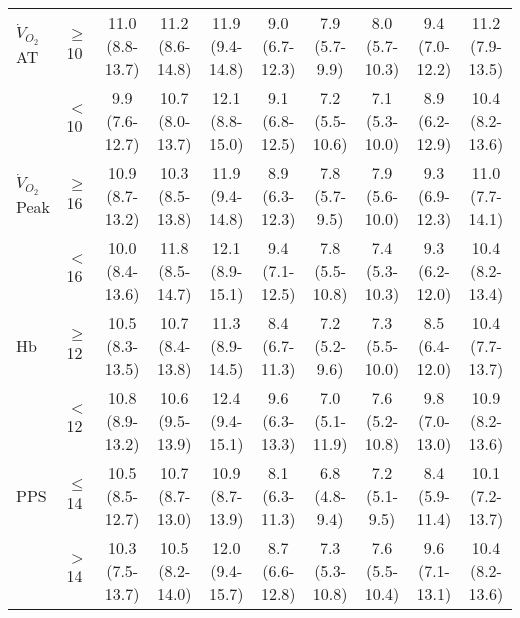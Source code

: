 \begin{sidewaystable}[p]
\begin{tabular}{|l l | cc cc cc cc |}
		$\dot{V}_{O_2}$AT   & $\geq$10  & 11.0 (8.8-13.7) & 11.2 (8.6-14.8) & 11.9 (9.4-14.8)  & 9.0 (6.7-12.3)  & 7.9 (5.7-9.9)  & 8.0 (5.7-10.3) & 9.4 (7.0-12.2)  & 11.2 (7.9-13.5) \\
		                    & $<$10     & 9.9 (7.6-12.7)  & 10.7 (8.0-13.7) & 12.1 (8.8-15.0)  & 9.1 (6.8-12.5)  & 7.2 (5.5-10.6) & 7.1 (5.3-10.0) & 8.9 (6.2-12.9)  & 10.4 (8.2-13.6) \\
		$\dot{V}_{O_2}$Peak & $\geq$16 & 10.9 (8.7-13.2) & 10.3 (8.5-13.8) & 11.9 (9.4-14.8)  & 8.9 (6.3-12.3)  & 7.8 (5.7-9.5)  & 7.9 (5.6-10.0) & 9.3 (6.9-12.3)  & 11.0 (7.7-14.1) \\
		                    & $<$16     & 10.0 (8.4-13.6) & 11.8 (8.5-14.7) & 12.1 (8.9-15.1)  & 9.4 (7.1-12.5)  & 7.8 (5.5-10.8) & 7.4 (5.3-10.3) & 9.3 (6.2-12.0)  & 10.4 (8.2-13.4) \\
		Hb                  & $\geq$12  & 10.5 (8.3-13.5) & 10.7 (8.4-13.8) & 11.3 (8.9-14.5)  & 8.4 (6.7-11.3)  & 7.2 (5.2-9.6)  & 7.3 (5.5-10.0) & 8.5 (6.4-12.0)  & 10.4 (7.7-13.7) \\
		                    & $<$12     & 10.8 (8.9-13.2) & 10.6 (9.5-13.9) & 12.4 (9.4-15.1)  & 9.6 (6.3-13.3)  & 7.0 (5.1-11.9) & 7.6 (5.2-10.8) & 9.8 (7.0-13.0)  & 10.9 (8.2-13.6) \\
		PPS                 & $\leq$14  & 10.5 (8.5-12.7) & 10.7 (8.7-13.0) & 10.9 (8.7-13.9)  & 8.1 (6.3-11.3)  & 6.8 (4.8-9.4)  & 7.2 (5.1-9.5)  & 8.4 (5.9-11.4)  & 10.1 (7.2-13.7) \\
		                    & $>$14     & 10.3 (7.5-13.7) & 10.5 (8.2-14.0) & 12.0 (9.4-15.7)  & 8.7 (6.6-12.8)  & 7.3 (5.3-10.8) & 7.6 (5.5-10.4) & 9.6 (7.1-13.1)  & 10.4 (8.2-13.6) \\ \hline
	\end{tabular}	
\end{sidewaystable}

























